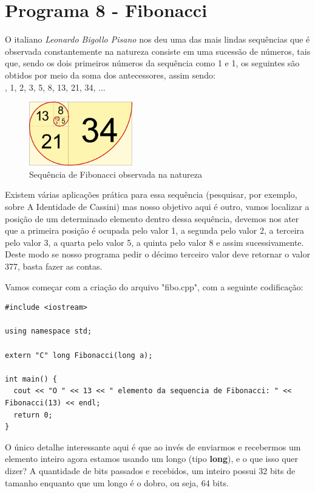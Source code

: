 \section{Programa 8 - Fibonacci}
O italiano \textit{Leonardo Bigollo Pisano} nos deu uma das mais lindas sequências que é observada constantemente na natureza consiste em uma sucessão de números, tais que, sendo os dois primeiros números da sequência como 1 e 1, os seguintes são obtidos por meio da soma dos antecessores, assim sendo: \\
{, 1, 2, 3, 5, 8, 13, 21, 34, ...}
\begin{figure}[H]
	\centering
	\includegraphics[width=0.4\textwidth]{Pictures/cap02/fibonacci}
	\caption{Sequência de Fibonacci observada na natureza}
\end{figure}

Existem várias aplicações prática para essa sequência (pesquisar, por exemplo, sobre A Identidade de Cassini) mas nosso objetivo aqui é outro, vamos localizar a posição de um determinado elemento dentro dessa sequência, devemos nos ater que a primeira posição é ocupada pelo valor 1, a segunda pelo valor 2, a terceira pelo valor 3, a quarta pelo valor 5, a quinta pelo valor 8 e assim sucessivamente. Deste modo se nosso programa pedir o décimo terceiro valor deve retornar o valor 377, basta fazer as contas.

Vamos começar com a criação do arquivo "fibo.cpp", com a seguinte codificação:
\begin{lstlisting}[]
#include <iostream>

using namespace std;

extern "C" long Fibonacci(long a);

int main() {
  cout << "O " << 13 << " elemento da sequencia de Fibonacci: " << Fibonacci(13) << endl;
  return 0;
}	
\end{lstlisting}

O único detalhe interessante aqui é que ao invés de enviarmos e recebermos um elemento inteiro agora estamos usando um longo (tipo \textbf{long}), e o que isso quer dizer? A quantidade de bits passados e recebidos, um inteiro possui 32 bits de tamanho enquanto que um longo é o dobro, ou seja, 64 bits.

